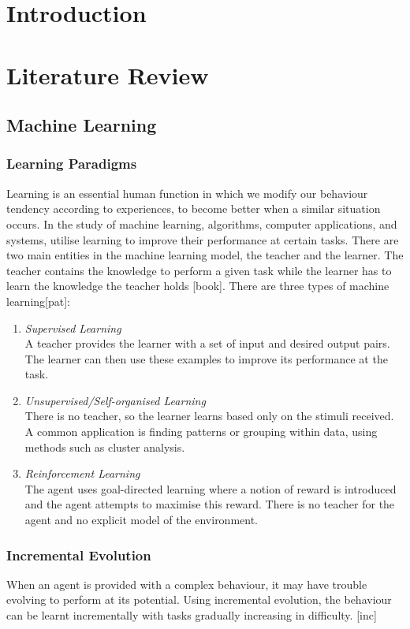 \documentclass[11pt,a4paper]{article}
\begin{document}
\section{Introduction}
\newpage
\section{Literature Review}
\subsection{Machine Learning}
\subsubsection{Learning Paradigms}
Learning is an essential human function in which we modify our behaviour tendency according to experiences, to become better when a similar situation occurs. In the study of machine learning, algorithms, computer applications, and systems, utilise learning to improve their performance at certain tasks. There are two main entities in the machine learning model, the teacher and the learner. The teacher contains the knowledge to perform a given task while the learner has to learn the knowledge the teacher holds [book]. There are three types of machine learning[pat]:
\begin{enumerate}
\item \emph{Supervised Learning}\\
A teacher provides the learner with a set of input and desired output pairs. The learner can then use these examples to improve its performance at the task.
\item \emph{Unsupervised/Self-organised Learning}\\
There is no teacher, so the learner learns based only on the stimuli received. A common application is finding patterns or grouping within data, using methods such as cluster analysis.
\item \emph{Reinforcement Learning}\\
The agent uses goal-directed learning where a notion of reward is introduced and the agent attempts to maximise this reward. There is no teacher for the agent and no explicit model of the environment.
\end{enumerate}

\subsubsection{Incremental Evolution}
When an agent is provided with a complex behaviour, it may have trouble evolving to perform at its potential. Using incremental evolution, the behaviour can be learnt incrementally with tasks gradually increasing in difficulty. [inc] 
\end{document}
